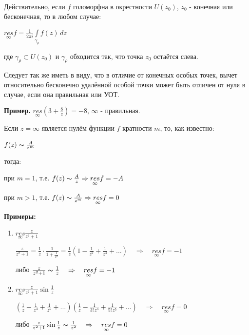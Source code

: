 \documentclass[a4paper, 12pt]{report}
\begin{document}
\par
Действительно, если $f$ голоморфна в окрестности $U(z_0)$, $z_0$ - конечная или бесконечная, то в любом случае:
\par\bigskip
\begin{center}
    $\underset{\infty}{res} f = \frac{1}{2 \pi i} \int\limits_{\gamma_\rho} f(z) \, dz$
\end{center}
\par\bigskip
где $\gamma_\rho \subset U(z_0)$ и $\gamma_\rho$ обходится так, что точка $z_0$ остаётся слева.
\par
Следует так же иметь в виду, что в отличие от конечных особых точек, вычет относительно бесконечно удалённой особой точки может быть отличен от нуля в случае, если она правильная или УОТ.
\par\bigskip
\textbf{Пример.} \quad $\underset{\infty}{res} (3 + \frac{8}{z}) = -8$, $\infty$ - правильная.
\par\bigskip
Если $z = \infty$ является нулём функции $f$ кратности $m$, то, как известно:
\begin{center}
    $f(z) \thicksim \frac{A}{z^m}$
\end{center}

тогда:

\begin{center}
    при $m = 1$, т.е. $f(z) \thicksim \frac{A}{z} \Rightarrow \underset{\infty}{res} f = -A$
    \par
     при $m > 1$, т.е. $f(z) \thicksim \frac{A}{z^m} \Rightarrow \underset{\infty}{res} f = 0$
\end{center}
\par\bigskip
\textbf{Примеры:}
\begin{enumerate}
    \item $\underset{\infty}{res} \frac{z}{z^2 + 1}$
\par\bigskip
\begin{center}
$\frac{z}{z^2 + 1} = \frac{1}{z} \cdot \frac{1}{1 + \frac{1}{z^2}} = \frac{1}{z} (1 - \frac{1}{z^2} + \frac{1}{z^4} + \dots) \quad \Rightarrow \quad \underset{\infty}{res} f = -1 $
\par\bigskip
либо \quad $\frac{z}{z^2 + 1} \thicksim \frac{1}{z} \quad \Rightarrow \quad \underset{\infty}{res} f = -1$
\end{center}

\item $ \underset{\infty}{res} \frac{z}{z^2 + 1} \sin{\frac{1}{z}}$
\par\bigskip
\begin{center}
$(\frac{1}{z} - \frac{1}{z^3} + \frac{1}{z^5} + \dots)(\frac{1}{z} - \frac{1}{3! \, z^3} + \frac{1}{5! \, z^5} + \dots) \quad \Rightarrow \quad \underset{\infty}{res} f = 0 $
\par\bigskip
либо \quad $\frac{z}{z^2 + 1} \sin{\frac{1}{z}} \thicksim \frac{1}{z^2} \quad \Rightarrow \quad \underset{\infty}{res} f = 0$
\end{center}
\end{enumerate}
\end{document}
